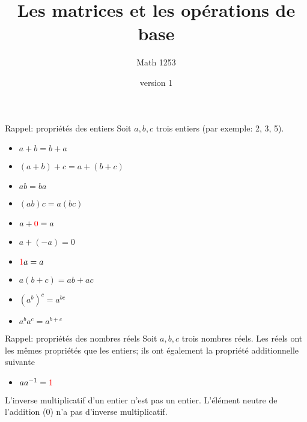 \documentclass[french]{beamer}
\title{Les matrices et les opérations de base}
\author{Math 1253} %
\date{version 1}   %
\begin{document}
	\frame{\titlepage}
	
\begin{frame}{Rappel: propriétés des entiers}
Soit $a, b, c$ trois entiers (par exemple: 2, 3, 5).
\begin{itemize}
\item $a+b = b+a$ \qquad {}
\item $(a+b) + c = a + (b+c)$ \qquad {}
\item $ab = ba$ \qquad {}
\item $(ab)c = a(bc)$ \qquad {}
\item $a + \textcolor{red}{0} = a$ \qquad {}
\item $a + (-a) = 0$ 
\item $\textcolor{red}{1}a = a$ \qquad {}
\item $a(b+c) = ab + ac$ \qquad {}
\item $\left(a^b\right)^c = a^{bc}$ \qquad {}
\item $a^b a^c = a^{b+c}$ \qquad {}
\end{itemize}

\end{frame}	

\begin{frame}{Rappel: propriétés des nombres réels}
Soit $a, b, c$ trois nombres réels. Les réels ont les mêmes propriétés que les entiers;
ils ont également la propriété additionnelle suivante
\begin{itemize}
\item $a a^{-1} = \textcolor{red}{1}$ 
\end{itemize}
\vfill
L'inverse multiplicatif d'un entier n'est pas un entier.\newline
L'élément neutre de l'addition (0) n'a pas d'inverse multiplicatif.

\end{frame}
	
\end{document}
